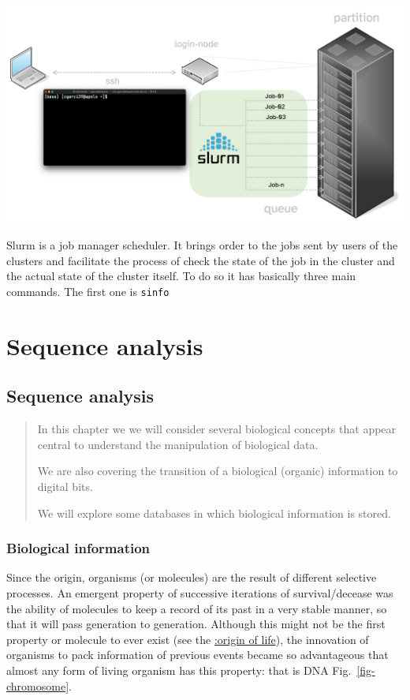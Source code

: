 \documentclass[
  letterpaper,
  DIV=11,
  numbers=noendperiod,
  oneside]{scrreprt}
\begin{document}
\includegraphics{chs-command-line/imgs-cli/cluster-process.png}

Slurm is a job manager scheduler. It brings order to the jobs sent by
users of the clusters and facilitate the process of check the state of
the job in the cluster and the actual state of the cluster itself. To do
so it has basically three main commands. The first one is \texttt{sinfo}

\part{Sequence analysis}

\hypertarget{sec-seq-analysis}{%
\chapter{Sequence analysis}\label{sec-seq-analysis}}

\begin{quote}
In this chapter we we will consider several biological concepts that
appear central to understand the manipulation of biological data.

We are also covering the transition of a biological (organic)
information to digital bits.

We will explore some databases in which biological information is
stored.
\end{quote}

\hypertarget{biological-information}{%
\section{Biological information}\label{biological-information}}

Since the origin, organisms (or molecules) are the result of different
selective processes. An emergent property of successive iterations of
survival/decease was the ability of molecules to keep a record of its
past in a very stable manner, so that it will pass generation to
generation. Although this might not be the first property or molecule to
ever exist (see the
\href{https://en.wikipedia.org/wiki/Abiogenesis}{:origin of life}), the
innovation of organisms to pack information of previous events became so
advantageous that almost any form of living organism has this property:
that is DNA Fig.~\ref{fig-chromosome}.
\end{document}
